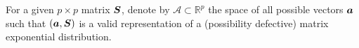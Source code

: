 For a given \(p\times p\) matrix \(\boldsymbol S\), denote by \(\mathcal A\subset \mathbb R^p\) the space of all possible vectors \(\boldsymbol a\) such that \((\boldsymbol a, \boldsymbol S)\) is a valid representation of a (possibility defective) matrix exponential distribution. %



%
